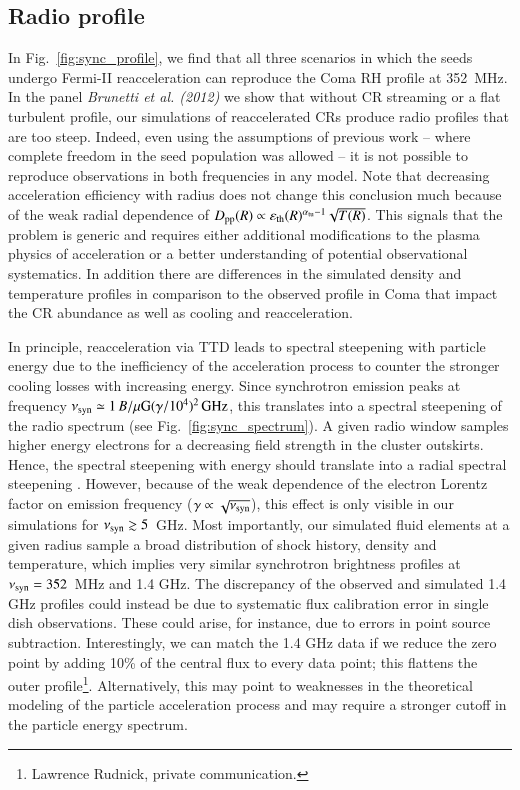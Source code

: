 \documentclass[fleqn,usenatbib,useAMS]{mnras}
\newcommand{\eps}{\varepsilon}
\begin{document}
\subsection{Radio profile}
In Fig.~\ref{fig:sync_profile}, we find that all three scenarios in
which the seeds undergo Fermi-II reacceleration can reproduce the Coma
RH profile at 352~MHz. In the panel {\it Brunetti et al. (2012)} we
show that without CR streaming or a flat turbulent profile, our
simulations of reaccelerated CRs produce radio profiles that are too
steep. Indeed, even using the assumptions of previous work -- where
complete freedom in the seed population was allowed -- it is not
possible to reproduce observations in both frequencies in any
model. Note that decreasing acceleration efficiency with radius does
not change this conclusion much because of the weak radial dependence
of $D_\rmn{pp}(R)\propto
\eps_\rmn{th}(R)^{\alpha_\rmn{tu}-1}\sqrt{T(R)}$. This
signals that the problem is generic and requires either additional
modifications to the plasma physics of acceleration or a better
understanding of potential observational systematics. In addition
there are differences in the simulated density and temperature
profiles in comparison to the observed profile in Coma that impact the
CR abundance as well as cooling and reacceleration.

In principle, reacceleration via TTD leads to spectral steepening with
particle energy due to the inefficiency of the acceleration process to
counter the stronger cooling losses with increasing energy. Since
synchrotron emission peaks at frequency $\nu_{\mathrm{syn}}\simeq 1\,
B/\mu{\mathrm{G}} (\gamma/10^4)^2\,{\mathrm{GHz}}$, this translates into a
spectral steepening of the radio spectrum (see
Fig.~\ref{fig:sync_spectrum}). A given radio window samples higher
energy electrons for a decreasing field strength in the cluster
outskirts. Hence, the spectral steepening with energy should translate
into a radial spectral steepening \citep{brunetti12}. However, because
of the weak dependence of the electron Lorentz factor on emission
frequency ($\gamma\propto\sqrt{\nu_{\mathrm{syn}}}$), this effect is only
visible in our simulations for $\nu_{\mathrm{syn}}\gtrsim5$~GHz. Most
importantly, our simulated fluid elements at a given radius sample a
broad distribution of shock history, density and temperature, which
implies very similar synchrotron brightness profiles at
$\nu_{\mathrm{syn}}=352$~MHz and 1.4 GHz. The discrepancy of the observed
and simulated 1.4 GHz profiles could instead be due to systematic flux
calibration error in single dish observations. These could arise, for
instance, due to errors in point source subtraction. Interestingly, we
can match the 1.4 GHz data if we reduce the zero point by adding 10\%
of the central flux to every data point; this flattens the outer
profile\footnote{Lawrence Rudnick, private communication.}.
Alternatively, this may point to weaknesses in the theoretical
modeling of the particle acceleration process and may require a
stronger cutoff in the particle energy spectrum.
\end{document}

